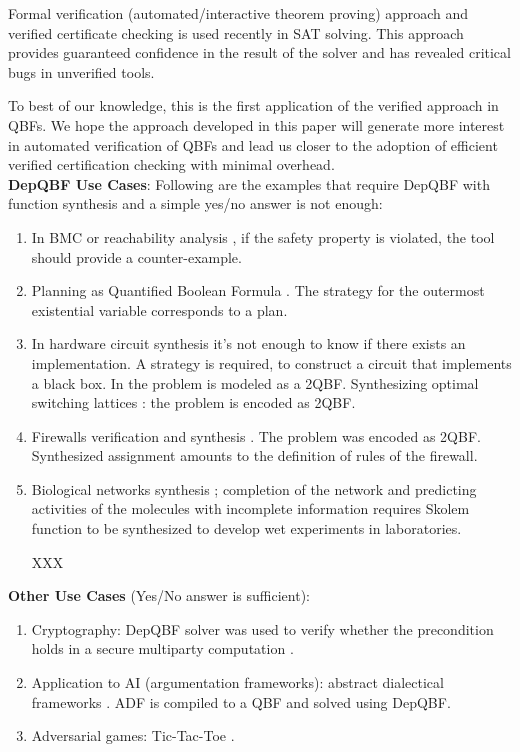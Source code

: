 \documentclass[runningheads]{llncs}
\newcommand{\0}{0}
\newcommand{\1}{1}
\begin{document}
Formal verification (automated/interactive theorem proving) approach \cite{Fleury2018a, Fleury2019a, BlanchetteFLW18} and verified certificate checking \cite{Cruz2017, Cruz2017b, Heule2017a, Lammich17} is used recently in SAT solving. This approach provides guaranteed confidence in the result of the solver and has revealed critical bugs \cite{Lammich17} in unverified tools. 

To best of our knowledge, this is the first application of the verified approach in QBFs. We hope the approach developed in this paper will generate more interest in automated verification of QBFs and lead us closer to the adoption of efficient verified certification checking with minimal overhead. \\
 
 
\textbf{DepQBF Use Cases}: 
Following are the examples that require DepQBF with function synthesis and a simple yes/no answer is not enough:
\begin{enumerate}
	\item In BMC or reachability analysis \cite{BloemKS14}, if the safety property is violated, the tool should provide a counter-example. 
	
	\item Planning as Quantified Boolean Formula \cite{Cashmore2012planning, EglyKLP17, Gasquet18}. The strategy for the outermost existential variable corresponds to a plan. 
	\item In hardware circuit synthesis \cite{BloemEKKL14, BloemKS14, Faymonville2017, Subramanyan2013, Li2013} it's not enough to know if there exists an implementation. A strategy is required, to construct a circuit that implements a black box. In \cite{Subramanyan2013, Li2013} the problem is modeled as a 2QBF. Synthesizing optimal switching lattices \cite{Gange2014synthesizing}: the problem is encoded as 2QBF. 
	\item Firewalls verification and synthesis \cite{Zhang2012verification}. The problem was encoded as 2QBF. Synthesized assignment amounts to the definition of rules of the firewall.
	\item Biological networks synthesis \cite{GuptaMS18}; completion of the network and predicting activities of the molecules with incomplete information requires Skolem function to be synthesized to develop wet experiments in laboratories.  
 	
 	XXX
\end{enumerate}

\textbf{Other Use Cases} (Yes/No answer is sufficient):
\begin{enumerate}
    \item Cryptography: DepQBF solver was used to verify whether the precondition holds in a secure multiparty computation \cite{Launchbury2014application}. 
	\item Application to AI (argumentation frameworks): abstract dialectical frameworks \cite{Brewka2020solving, Diller2014reasoning}. ADF is compiled to a QBF and solved using DepQBF.
	\item Adversarial games: Tic-Tac-Toe \cite{DiptaramaYS16}.
\end{enumerate}
\end{document}
